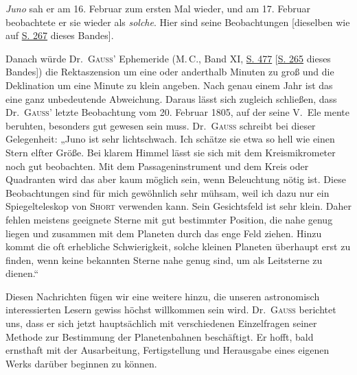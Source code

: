 \par\indent \emph{Juno} sah er am 16. Februar zum ersten Mal wieder, und am 17. Februar beobachtete er sie wieder als \emph{solche}. Hier sind seine Beobachtungen [dieselben wie auf \hyperlink{native-272}{S. 267} dieses Bandes].

\par\indent Danach würde Dr.\ \textsc{Gauss}’ Ephemeride (M.\,C., Band XI, \href{https://www.digitale-sammlungen.de/en/view/bsb10538603?page=491}{S. 477} [\hyperlink{native-270}{S. 265} dieses Bandes]) die Rektaszension um eine oder anderthalb Minuten zu groß und die Deklination um eine Minute zu klein angeben. Nach genau einem Jahr ist das eine ganz unbedeutende Abweichung. Daraus lässt sich zugleich schließen, dass Dr.\ \textsc{Gauss}’ letzte Beobachtung vom 20. Februar 1805, auf der seine V.\ Ele%
%
mente beruhten, besonders gut gewesen sein muss. Dr.~\textsc{Gauss} schreibt bei dieser Gelegenheit: „Juno ist sehr lichtschwach. Ich schätze sie etwa so hell wie einen Stern elfter Größe. Bei klarem Himmel lässt sie sich mit dem Kreismikrometer noch gut beobachten. Mit dem Passageninstrument und dem Kreis oder Quadranten wird das aber kaum möglich sein, wenn Beleuchtung nötig ist. Diese Beobachtungen sind für mich gewöhnlich sehr mühsam, weil ich dazu nur ein Spiegelteleskop von \textsc{Short} verwenden kann. Sein Gesichtsfeld ist sehr klein. Daher fehlen meistens geeignete Sterne mit gut bestimmter Position, die nahe genug liegen und zusammen mit dem Planeten durch das enge Feld ziehen. Hinzu kommt die oft erhebliche Schwierigkeit, solche kleinen Planeten überhaupt erst zu finden, wenn keine bekannten Sterne nahe genug sind, um als Leitsterne zu dienen.“

\par\indent Diesen Nachrichten fügen wir eine weitere hinzu, die unseren astronomisch interessierten Lesern gewiss höchst willkommen sein wird. Dr.~\textsc{Gauss} berichtet uns, dass er sich jetzt hauptsächlich mit verschiedenen Einzelfragen seiner Methode zur Bestimmung der Planetenbahnen beschäftigt. Er hofft, bald ernsthaft mit der Ausarbeitung, Fertigstellung und Herausgabe eines eigenen Werks darüber beginnen zu können.

\begin{flushright}
\end{flushright}
